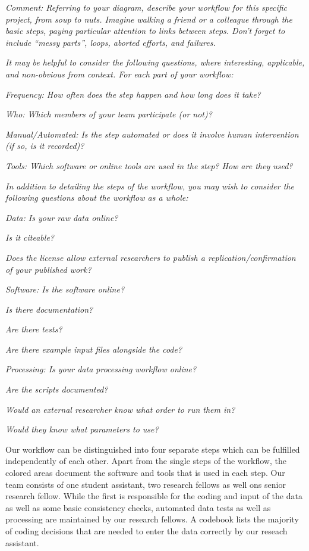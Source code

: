 \documentclass[
  11pt
]{article}
\begin{document}
\textit{Comment: Referring to your diagram, describe your workflow for this specific project, from soup to nuts. Imagine walking a friend or a colleague through the basic steps, paying particular attention to links between steps. Don't forget to include ``messy parts'', loops, aborted efforts, and failures.}

\noindent
\textit{It may be helpful to consider the following questions, where interesting, applicable, and non-obvious from context. For each part of your workflow:}

\noindent
\textit{Frequency: How often does the step happen and how long does it take?}

\noindent
\textit{Who: Which members of your team participate (or not)?}

\noindent
\textit{Manual/Automated: Is the step automated or does it involve human intervention (if so, is it recorded)?}

\noindent
\textit{Tools: Which software or online tools are used in the step? How are they used?}

\noindent
\textit{In addition to detailing the steps of the workflow, you may wish to consider the following questions about the workflow as a whole:}

\noindent
\textit{Data: Is your raw data online?}

\textit{Is it citeable?}

\textit{Does the license allow external researchers to publish a replication/confirmation of your published work?}

\noindent
\textit{Software: Is the software online?}

\textit{Is there documentation?}

\textit{Are there tests?}

\textit{Are there example input files alongside the code?}

\noindent
\textit{Processing: Is your data processing workflow online?}

\textit{Are the scripts documented?}

\textit{Would an external researcher know what order to run them in?}

\textit{Would they know what parameters to use?}

\vspace*{1cm}

\noindent
Our workflow can be distinguished into four separate steps which can be fulfilled independently of each other. Apart from the single steps of the workflow, the colored areas document the software and tools that is used in each step. Our team consists of one student assistant, two research fellows as well ons senior research fellow. While the first is responsible for the coding and input of the data as well as some basic consistency checks, automated data tests as well as processing are maintained by our research fellows. A codebook lists the majority of coding decisions that are needed to enter the data correctly by our reseach assistant.
\end{document}
